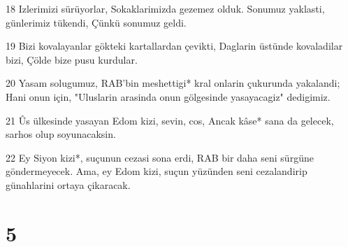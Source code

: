 \par 18 Izlerimizi sürüyorlar, Sokaklarimizda gezemez olduk. Sonumuz yaklasti, günlerimiz tükendi, Çünkü sonumuz geldi.
\par 19 Bizi kovalayanlar gökteki kartallardan çevikti, Daglarin üstünde kovaladilar bizi, Çölde bize pusu kurdular.
\par 20 Yasam solugumuz, RAB'bin meshettigi* kral onlarin çukurunda yakalandi; Hani onun için, "Uluslarin arasinda onun gölgesinde yasayacagiz" dedigimiz.
\par 21 Ûs ülkesinde yasayan Edom kizi, sevin, cos, Ancak kâse* sana da gelecek, sarhos olup soyunacaksin.
\par 22 Ey Siyon kizi*, suçunun cezasi sona erdi, RAB bir daha seni sürgüne göndermeyecek. Ama, ey Edom kizi, suçun yüzünden seni cezalandirip günahlarini ortaya çikaracak.

\chapter{5}

